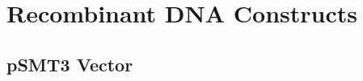 \documentclass[12pt,twoside]{reedthesis}
\begin{document}
		 

   
    
%    
% 
%
 
   \section{Recombinant DNA Constructs}
   
   \subsection{pSMT3 Vector}
   
\end{document}
